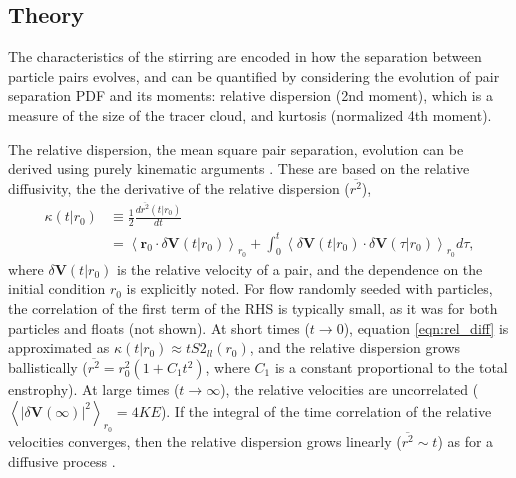\documentclass[]{ametsoc}
\begin{document}
\subsection{Theory} 
The characteristics of the stirring are encoded in how the separation between particle pairs evolves, and can be quantified by considering the evolution of pair separation PDF and its moments: relative dispersion (2nd moment), which is a measure of the size of the tracer cloud, and kurtosis (normalized 4th moment).

The relative dispersion, the mean square pair separation, evolution can be derived using purely kinematic arguments \citep{babiano1990relative}.
These are based on the relative diffusivity, the  the derivative of the relative dispersion ($\overline{r^2}$), 
\begin{equation}
\begin{split}
\kappa(t | r_0) & \equiv \frac{1}{2} \frac{d \overline{r^2} (t | r_0)}{dt} \\		       & = \left< \mathbf{r}_0 \cdot \delta \mathbf{V}(t | r_0) \right>_{r_0}  + \int_0^t \left<\delta \mathbf{V}(t | r_0) \cdot \delta \mathbf{V}(\tau | r_0)\right>_{r_0} d\tau,
\end{split}
\label{eqn:rel_diff}
\end{equation}
where $\delta \mathbf{V} (t | r_0)$ is the relative velocity of a pair, and the dependence on the initial condition $r_0$ is explicitly noted. For flow randomly seeded with particles, the correlation of the first term of the RHS is typically small, as it was for both particles and floats (not shown). At short times ($t\rightarrow0$), equation \ref{eqn:rel_diff} is approximated as $\kappa(t|r_0) \approx t S2_{ll}(r_0)$, and the relative dispersion grows ballistically ($\overline{r^2} = r_0^2(1 + C_1t^2)$, where $C_1$ is a constant proportional to the total enstrophy). At large times ($t\rightarrow\infty$), the relative velocities are uncorrelated ($\left<|\delta \mathbf{V}(\infty )|^2\right>_{r_0} = 4 KE$). If the integral of the time correlation of the relative velocities converges, then the relative dispersion grows linearly  ($\overline{r^2} \sim t$) as for a diffusive process \citep{taylor1922diffusion}.
\end{document}
